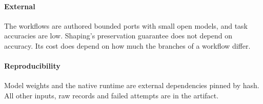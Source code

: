 \paragraph{External}
The workflows are authored bounded ports with small open models, and task
accuracies are low. Shaping's preservation guarantee does not depend on
accuracy. Its cost does depend on how much the branches of a workflow differ.

\paragraph{Reproducibility}
Model weights and the native runtime are external dependencies pinned by hash.
All other inputs, raw records and failed attempts are in the artifact.
